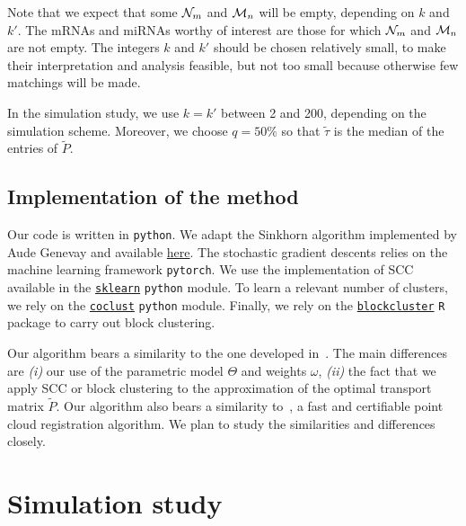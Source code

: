 Note  that we  expect that  some $\mathcal{N}_{m}$  and $\mathcal{M}_{n}$  will be  empty,
depending on $k$ and  $k'$. The mRNAs and miRNAs worthy  of interest are those
for which $\mathcal{N}_{m}$ and $\mathcal{M}_{n}$ are not empty. The integers $k$ and $k'$
should be chosen  relatively small, to make their  interpretation and analysis
feasible, but not too small because otherwise few matchings will be made.

In the  simulation study, we  use $k=k'$ between 2  and 200, depending  on the
simulation scheme.  Moreover,  we choose $q = 50\%$ so  that $\tilde{\tau}$ is
the median of the entries of $\tilde{P}$.

\subsection{Implementation of the method}
\label{subsec:code}


Our  code is  written  in  \texttt{python}. We  adapt  the Sinkhorn  algorithm
implemented        by         Aude        Genevay         and        available
\href{https://github.com/audeg/Sinkhorn-GAN/blob/master/sinkhorn.py}{here}. The
stochastic  gradient  descents  relies   on  the  machine  learning  framework
\texttt{pytorch}.   We  use  the  implementation   of  SCC  available  in  the
\href{https://scikit-learn.org/stable/modules/generated/sklearn.cluster.SpectralCoclustering.html}{\texttt{sklearn}}
\texttt{python} module.   To learn a relevant  number of clusters, we  rely on
the
\href{https://coclust.readthedocs.io/en/v0.2.1/api/evaluation.html}{\texttt{coclust}}
\texttt{python}      module.       Finally,      we      rely      on      the
\href{https://cran.r-project.org/web/packages/blockcluster/index.html}{\texttt{blockcluster}}
\texttt{R} package to carry out block clustering. 

Our algorithm bears a similarity  to the one developed in~\cite{Laclau17}. The
main differences are \textit{(i)} our use of the parametric model $\Theta$ and
weights $\omega$, \textit{(ii)} the fact that we apply SCC or block clustering
to  the  approximation  of  the optimal  transport  matrix  $\tilde{P}$.   Our
algorithm  also  bears  a  similarity  to~\cite{yang2020teaser},  a  fast  and
certifiable  point  cloud  registration  algorithm.   We  plan  to  study  the
similarities and differences closely.





\section{Simulation study}
\label{sec:simulation}

